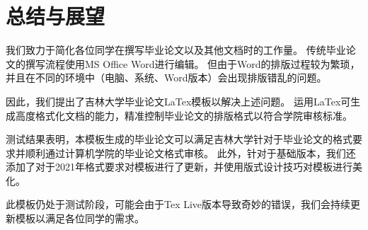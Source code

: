 \chapter{总结与展望}
我们致力于简化各位同学在撰写毕业论文以及其他文档时的工作量。
传统毕业论文的撰写流程使用MS Office Word进行编辑。
但由于Word的排版过程较为繁琐，并且在不同的环境中（电脑、系统、Word版本）会出现排版错乱的问题。

因此，我们提出了吉林大学毕业论文LaTex模板以解决上述问题。
运用LaTex可生成高度格式化文档的能力，精准控制毕业论文的排版格式以符合学院审核标准。

测试结果表明，本模板生成的毕业论文可以满足吉林大学针对于毕业论文的格式要求并顺利通过计算机学院的毕业论文格式审核。
此外，针对于基础版本，我们还添加了对于2021年格式要求对模板进行了更新，并使用版式设计技巧对模板进行美化。

此模板仍处于测试阶段，可能会由于Tex Live版本导致奇妙的错误，我们会持续更新模板以满足各位同学的需求。